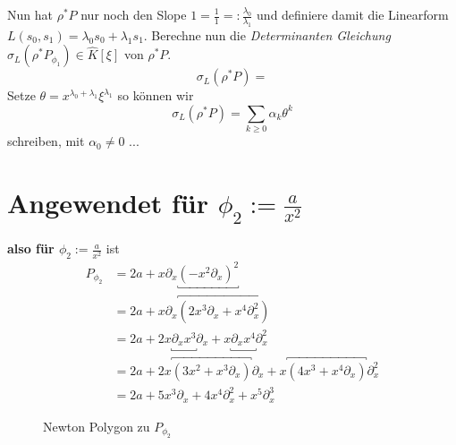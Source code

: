 \begin{comment}
Ab hier nochmal neu / verbessern!
\end{comment}
Nun hat $\rho^*P$ nur noch den Slope
$1=\frac{1}{1}=:\frac{\lambda_0}{\lambda_1}$ und definiere damit die Linearform
$L(s_0,s_1)=\lambda_0s_0+\lambda_1s_1$.  Berechne nun die \emph{Determinanten
Gleichung} $\sigma_L(\rho^*P_{\phi_1})\in \hat
K[\xi]$ von $\rho^*P$. 
\[
\sigma_L(\rho^*P)=
\]
Setze $\theta=x^{\lambda_0+\lambda_1}\xi^{\lambda_1}$ so können wir 
\[
\sigma_L(\rho^*P)=\sum_{k\geq 0}\alpha_k\theta^k
\]
schreiben, mit $\alpha_0\neq 0$ ...

\section{Angewendet für $\phi_2:=\frac{a}{x^2}$}
\textbf{also für $\phi_2:=\frac{a}{x^2}$} ist
\begin{align*}
P_{\phi_2} &=2a+x\partial_x\underbracket{(-x^2\partial_x)^{2}}\\
           &=2a +x\partial_x \overbracket{(2x^3\partial_x+x^4\partial_x^2)} \\
           &=2a 
             +2x\underbracket{\partial_xx^3}\partial_x
             +x\underbracket{\partial_xx^4}\partial_x^2 \\
           &=2a 
             +2x\overbracket{(3x^2+x^3\partial_x)}\partial_x
             +x\overbracket{(4x^3+x^4\partial_x)}\partial_x^2 \\
           &=2a+5x^3\partial_x+4x^{4}\partial_x^2+x^5\partial_x^3
\end{align*}
\begin{figure}[H]
\caption{Newton Polygon zu $P_{\phi_2}$}
\begin{center}
\end{center}
\end{figure}

